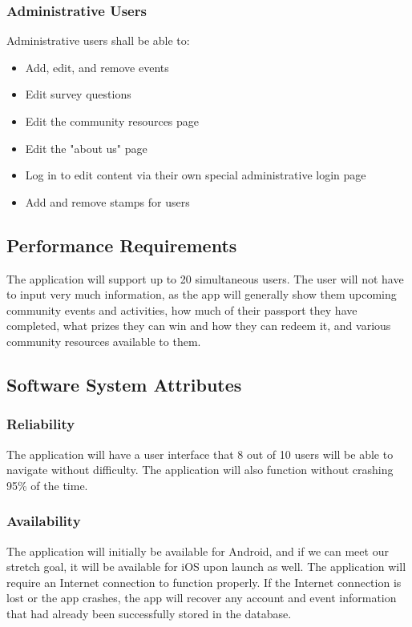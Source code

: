 \documentclass[draftclsnofoot, onecolumn, 10pt, compsoc]{IEEEtran}
\begin{document}
			\subsubsection{Administrative Users}
				Administrative users shall be able to:
				\begin{itemize}
					\item Add, edit, and remove events
					\item Edit survey questions
					\item Edit the community resources page
					\item Edit the "about us" page
					\item Log in to edit content via their own special administrative login page
					\item Add and remove stamps for users
				\end{itemize}

		\subsection{Performance Requirements}
			The application will support up to 20 simultaneous users. The user will not have to input very much information, as the app will generally show them upcoming community events and activities, how much of their passport they have completed, what prizes they can win and how they can redeem it, and various community resources available to them.

		\subsection{Software System Attributes}
			\subsubsection{Reliability}
				The application will have a user interface that 8 out of 10 users will be able to navigate without difficulty. The application will also function without crashing 95\% of the time.

			\subsubsection{Availability}
				The application will initially be available for Android, and if we can meet our stretch goal, it will be available for iOS upon launch as well. The application will require an Internet connection to function properly. If the Internet connection is lost or the app crashes, the app will recover any account and event information that had already been successfully stored in the database.
\end{document}
